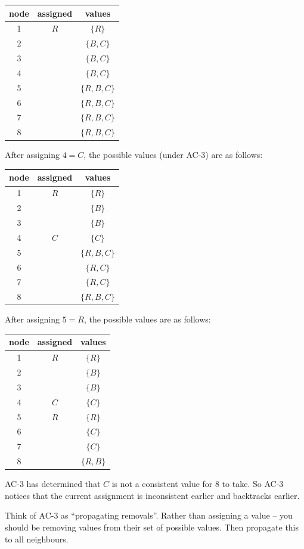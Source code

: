 \documentclass[10pt,\jkfside,a4paper]{article}
\begin{document}
\begin{enumerate}
\begin{itemize}
\begin{table}[H]
\centering
\begin{tabular}{c|c|c}
node & assigned & values \\
\hline
1 & $R$ & $\{R\}$ \\
2 & & $\{B, C\}$ \\
3 & & $\{B, C\}$ \\
4 & & $\{B, C\}$ \\
5 & & $\{R, B, C\}$ \\
6 & & $\{R, B, C\}$ \\
7 & & $\{R, B, C\}$ \\
8 & & $\{R, B, C\}$ \\
\end{tabular}
\end{table}

After assigning $4 = C$, the possible values (under AC-3) are as follows:

\begin{table}[H]
\centering
\begin{tabular}{c|c|c}
node & assigned & values \\
\hline
1 & $R$ & $\{R\}$ \\
2 & & $\{B\}$ \\
3 & & $\{B\}$ \\
4 & $C$ & $\{C\}$ \\
5 & & $\{R, B, C\}$ \\
6 & & $\{R, C\}$ \\
7 & & $\{R, C\}$ \\
8 & & $\{R, B, C\}$ \\
\end{tabular}
\end{table}

After assigning $5 = R$, the possible values are as follows:

\begin{table}[H]
\centering
\begin{tabular}{c|c|c}
node & assigned & values \\
\hline
1 & $R$ & $\{R\}$ \\
2 & & $\{B\}$ \\
3 & & $\{B\}$ \\
4 & $C$ & $\{C\}$ \\
5 & $R$ & $\{R\}$ \\
6 & & $\{C\}$ \\
7 & & $\{C\}$ \\
8 & & $\{R, B\}$ \\
\end{tabular}
\end{table}

AC-3 has determined that $C$ is not a consistent value for $8$ to take. So
AC-3 notices that the current assignment is inconsistent earlier and
backtracks earlier.

{\color{blue}
Think of AC-3 as ``propagating removals''. Rather than assigning a value --
you should be removing values from their set of possible values. Then
propagate this to all neighbours.
}

\end{itemize}

\end{enumerate}
\end{document}
